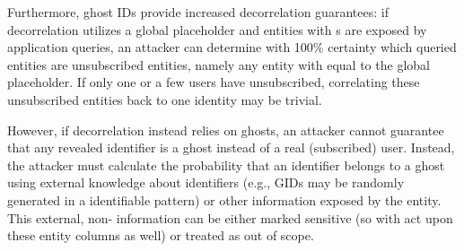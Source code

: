 Furthermore, ghost IDs provide increased decorrelation guarantees: if decorrelation utilizes a
global placeholder and entities with \uidkey{}s are exposed by application queries, an attacker can
determine with 100\% certainty which queried entities are unsubscribed entities, namely any entity
with \uidkey{} equal to the global placeholder. If only one or a few users have unsubscribed,
correlating these unsubscribed entities back to one identity may be trivial.

However, if decorrelation instead relies on ghosts, an attacker cannot guarantee that any revealed
identifier is a ghost instead of a real (subscribed) user. Instead, the attacker must calculate the
probability that an identifier belongs to a ghost using external knowledge about identifiers (e.g.,
GIDs may be randomly generated in a identifiable pattern) or other information exposed by the
entity. This external, non-\uidkey{} information can be either marked sensitive (so \sys{} with
act upon these entity columns as well) or treated as out of scope.
